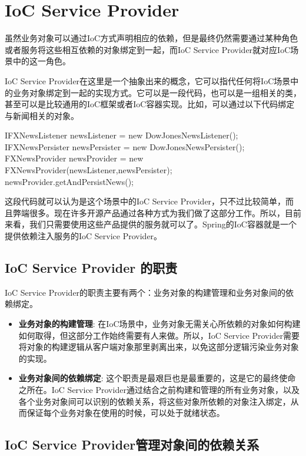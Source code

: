\section{IoC Service Provider}

虽然业务对象可以通过IoC方式声明相应的依赖，但是最终仍然需要通过某种角色或者服务将这些相互依赖的对象绑定到一起，而IoC Service Provider就对应IoC场景中的这一角色。

IoC Service Provider在这里是一个抽象出来的概念，它可以指代任何将IoC场景中的业务对象绑定到一起的实现方式。它可以是一段代码，也可以是一组相关的类，甚至可以是比较通用的IoC框架或者IoC容器实现。比如，可以通过以下代码绑定与新闻相关的对象。

\begin{Java}
IFXNewsListener newsListener = new DowJonesNewsListener(); 
IFXNewsPersister newsPersister = new DowJonesNewsPersister(); 
FXNewsProvider newsProvider = new FXNewsProvider(newsListener,newsPersister); 
newsProvider.getAndPersistNews(); 
\end{Java}

这段代码就可以认为是这个场景中的IoC  Service  Provider，只不过比较简单，而且弊端很多。现在许多开源产品通过各种方式为我们做了这部分工作。所以，目前来看，我们只需要使用这些产品提供的服务就可以了。Spring的IoC容器就是一个提供依赖注入服务的IoC Service Provider。

\subsection{IoC Service Provider 的职责}

IoC Service Provider的职责主要有两个：业务对象的构建管理和业务对象间的依赖绑定。

\begin{itemize}
    \item \textbf{业务对象的构建管理}: 在IoC场景中，业务对象无需关心所依赖的对象如何构建如何取得，但这部分工作始终需要有人来做。所以，IoC Service Provider需要将对象的构建逻辑从客户端对象那里剥离出来，以免这部分逻辑污染业务对象的实现。
    \item \textbf{业务对象间的依赖绑定}: 这个职责是最艰巨也是最重要的，这是它的最终使命之所在。IoC Service Provider通过结合之前构建和管理的所有业务对象，以及各个业务对象间可以识别的依赖关系，将这些对象所依赖的对象注入绑定，从而保证每个业务对象在使用的时候，可以处于就绪状态。
\end{itemize}

\subsection{IoC Service Provider管理对象间的依赖关系}

